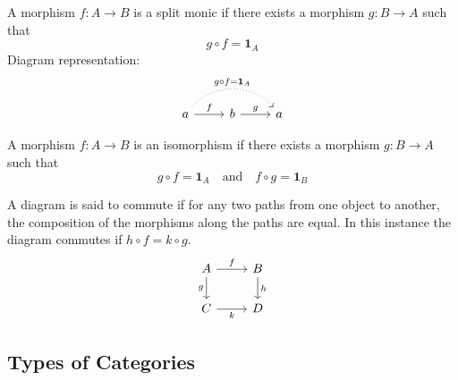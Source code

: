 \documentclass[10pt]{article}
\begin{document}
\begin{definition}
  A morphism $f : A \rightarrow B$ is a split monic if there exists a morphism $g : B \rightarrow A$ such that
  \[
    g \circ f = \textbf{1}_A
  \]
  Diagram representation:
  \[
    \begin{tikzcd}
      a \arrow[rr, bend left=50, dotted, "g \circ f = \mathbf 1_A"] \arrow[r, "f"] & b \arrow[r, "g"] & a
    \end{tikzcd}
  \]
\end{definition}

\begin{definition}[Isomorphism]
  A morphism $f : A \rightarrow B$ is an isomorphism if there exists a morphism $g : B \rightarrow A$ such that
  \[
    g \circ f = \textbf{1}_A \quad \text{and} \quad f \circ g = \textbf{1}_B
  \]
\end{definition}

\begin{definition}
  A diagram is said to commute if for any two paths from one object to another, the composition of the morphisms along the paths are equal.
  In this instance the diagram commutes if $h \circ f = k \circ g$.
  \[
    \begin{tikzcd}
      A \arrow[r, "f"] \arrow[d, "g"'] & B \arrow[d, "h"] \\
      C \arrow[r, "k"'] & D
    \end{tikzcd}
  \]
\end{definition}

\subsection{Types of Categories}
\end{document}
